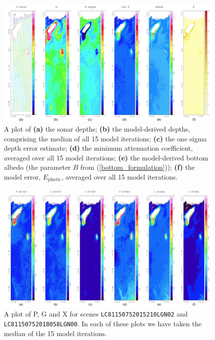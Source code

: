 \documentclass[12pt]{article}
\numberwithin{equation}{section}
\begin{document}
\begin{landscape}
\begin{figure}[H]
\centering
\includegraphics[height=0.8\textheight]{tile_1_edited_medium.jpg}
\caption{A plot of \textbf{(a)} the sonar depths; \textbf{(b)} the model-derived depths, 
comprising the median of all 15 model iterations; \textbf{(c)} the one sigma 
depth error estimate; \textbf{(d)} the minimum attenuation coefficient, averaged over 
all 15 model iterations; \textbf{(e)} the model-derived bottom albedo (the parameter 
$B$ from (\ref{bottom_formulation})); \textbf{(f)} the model error, 
$E_{\text{photic}}$, averaged over all 15 model iterations.}
\end{figure}
\end{landscape}

\begin{landscape}
\begin{figure}[H]
\centering
\includegraphics[height=0.8\textheight]{tile_2_low.jpg}
\caption{A plot of P, G and X for scenes \texttt{LC81150752015210LGN02} and \texttt{LC81150752018058LGN00}. In
each of these plots we have taken the median of the 15 model iterations.}
\end{figure}
\end{landscape}
\end{document}

